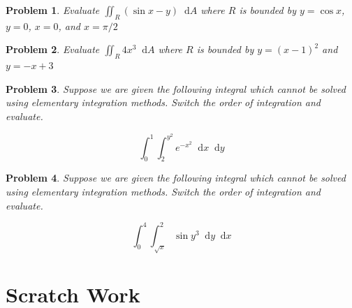 \documentclass[11pt]{article}
\newtheorem{problem}{Problem}
\newcommand*\dif{\mathop{}\!\mathrm{d}}
\begin{document}
\begin{problem}
    Evaluate $\iint_R (\sin{x}-y) \dif{A}$ where $R$ is bounded by $y=\cos{x}$, $y=0$, $x=0$, and $x=\pi/2$
\end{problem}


\vspace{6.5cm}




\begin{problem}
    Evaluate $\iint_R 4x^3 \dif{A}$ where $R$ is bounded by $y = (x-1)^2$ and $y = -x+3$
\end{problem}

\vspace{6.5cm}


\begin{problem}
Suppose we are given the following integral which cannot be solved using elementary integration methods. Switch the order of integration and evaluate.

\begin{equation*}
\int_0^1 \int_2^{y^2} e^{-x^2} \dif{x} \dif{y}
\end{equation*}
\end{problem}


\vspace{7cm}

\begin{problem}
Suppose we are given the following integral which cannot be solved using elementary integration methods. Switch the order of integration and evaluate.

\begin{equation*}
\int_0^4 \int_{\sqrt{x}}^2 \sin{y^3} \dif{y} \dif{x}
\end{equation*}
\end{problem}

\newpage

\section{Scratch Work}
\end{document}
